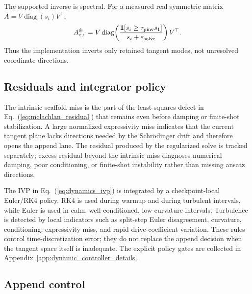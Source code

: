 \documentclass[
  reprint,
  amsmath,
  amssymb,
  aps,
  pra,
  nofootinbib,
  superscriptaddress,
  floatfix
]{revtex4-2}
\newcommand{\eps}{\varepsilon}
\begin{document}
The supported inverse is spectral. For a measured real symmetric matrix $A=V\operatorname{diag}(s_i)V^\top$,
\begin{equation}
A_{\tau,\eps}^{\oplus}
=V\operatorname{diag}\!\left(
\frac{\mathbf 1[s_i\ge\tau_{\rm pinv}s_1]}{s_i+\eps_{\rm solve}}
\right)V^\top .
\label{eq:supported_inverse}
\end{equation}
Thus the implementation inverts only retained tangent modes, not unresolved coordinate directions.

\subsection{Residuals and integrator policy}

The intrinsic scaffold miss is the part of the least-squares defect in Eq.~(\ref{eq:mclachlan_residual}) that remains even before damping or finite-shot stabilization. A large normalized expressivity miss indicates that the current tangent plane lacks directions needed by the Schr\"odinger drift and therefore opens the append lane. The residual produced by the regularized solve is tracked separately; excess residual beyond the intrinsic miss diagnoses numerical damping, poor conditioning, or finite-shot instability rather than missing ansatz directions.

The IVP in Eq.~(\ref{eq:dynamics_ivp}) is integrated by a checkpoint-local Euler/RK4 policy. RK4 is used during warmup and during turbulent intervals, while Euler is used in calm, well-conditioned, low-curvature intervals. Turbulence is detected by local indicators such as split-step Euler disagreement, curvature, conditioning, expressivity miss, and rapid drive-coefficient variation. These rules control time-discretization error; they do not replace the append decision when the tangent space itself is inadequate. The explicit policy gates are collected in Appendix~\ref{app:dynamic_controller_details}.

\subsection{Append control}
\end{document}
